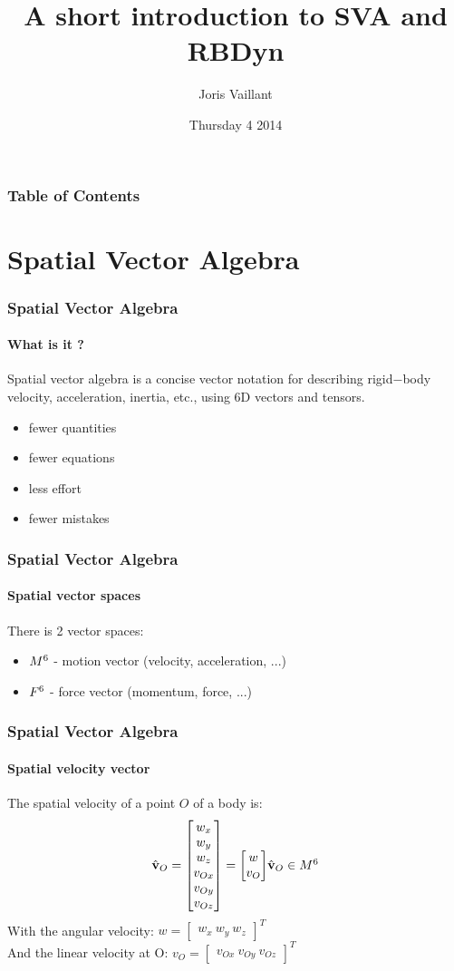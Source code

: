 \documentclass{beamer}
\title
{A short introduction to SVA and RBDyn}
\author
{Joris Vaillant}
\institute{LIRMM}{}
\date{Thursday 4 2014}
\begin{document}
	\frame{\titlepage}

	\begin{frame}
		\frametitle{Table of Contents}
		\tableofcontents
  	\end{frame}


	\section{Spatial Vector Algebra}
  	\begin{frame}
		\frametitle{Spatial Vector Algebra}
		\framesubtitle{What is it ?}
		Spatial vector algebra is a concise vector notation for describing rigid−body velocity,
		acceleration, inertia, etc., using 6D vectors and tensors.
		\begin{itemize}
			\item fewer quantities
			\item fewer equations
			\item less effort
			\item fewer mistakes
		\end{itemize}
  	\end{frame}


  	\begin{frame}
		\frametitle{Spatial Vector Algebra}
		\framesubtitle{Spatial vector spaces}
		There is 2 vector spaces:
		\begin{itemize}
			\item $ M^{6} $ - motion vector (velocity, acceleration, ...)
			\item $ F^{6} $ - force vector (momentum, force, ...)
		\end{itemize}
  	\end{frame}


  	\begin{frame}
		\frametitle{Spatial Vector Algebra}
		\framesubtitle{Spatial velocity vector}
		The spatial velocity of a point $ O $ of a body is:
		\begin{subequations}
			$$
			\velocityvecHatOrigin{O} = \begin{bmatrix} w_x \\ w_y \\ w_z \\ v_{Ox} \\ v_{Oy} \\ v_{Oz} \end{bmatrix} = \begin{bmatrix} w \\ v_O \end{bmatrix}
			$$
			$$
			\velocityvecHatOrigin{O} \in \motionspace{6}
			$$
		\end{subequations}
		With the angular velocity:
		$ w = \begin{bmatrix} w_x\ w_y\ w_z \end{bmatrix}^T $\\
		And the linear velocity at O:
		$ v_O = \begin{bmatrix} v_{Ox}\ v_{Oy}\ v_{Oz} \end{bmatrix}^T $
	\end{frame}
\end{document}
